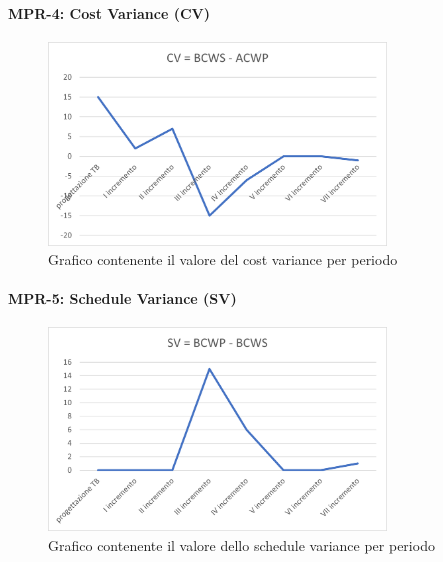 \paragraph{MPR-4: Cost Variance (CV)}\label{_CV}
\begin{figure}[!htb]
    \centering
    \includegraphics[width=0.8\textwidth]{res/images/metriche_costi/CV.png}
    \caption{Grafico contenente il valore del cost variance per periodo}
\end{figure}
\newpage
\paragraph{MPR-5: Schedule Variance (SV)}\label{_SV}
\begin{figure}[!htb]
    \centering
    \includegraphics[width=0.8\textwidth]{res/images/metriche_costi/SV.png}
    \caption{Grafico contenente il valore dello schedule variance per periodo}
\end{figure} 

\newpage

